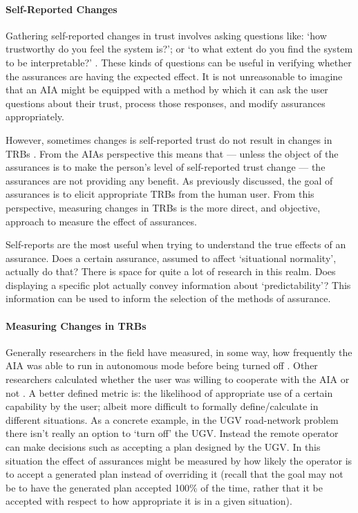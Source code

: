     \paragraph{Self-Reported Changes} Gathering self-reported changes in trust involves asking questions like: `how trustworthy do you feel the system is?'; or `to what extent do you find the system to be interpretable?' \cite{Mcknight2011-gv,Muir1996-gt,Wickens1999-la,Salem2015-md,Kaniarasu2013-ho}. These kinds of questions can be useful in verifying whether the assurances are having the expected effect. It is not unreasonable to imagine that an AIA might be equipped with a method by which it can ask the user questions about their trust, process those responses, and modify assurances appropriately.
    
    However, sometimes changes is self-reported trust do not result in changes in TRBs \cite{Dzindolet2003-ts}. From the AIAs perspective this means that --- unless the object of the assurances is to make the person's level of self-reported trust change --- the assurances are not providing any benefit. As previously discussed, the goal of assurances is to elicit appropriate TRBs from the human user. From this perspective, measuring changes in TRBs is the more direct, and objective, approach to measure the effect of assurances.

    Self-reports are the most useful when trying to understand the true effects of an assurance. Does a certain assurance, assumed to affect `situational normality', actually do that? There is space for quite a lot of research in this realm. Does displaying a specific plot actually convey information about `predictability'? This information can be used to inform the selection of the methods of assurance.

    \paragraph{Measuring Changes in TRBs} Generally researchers in the field have measured, in some way, how frequently the AIA was able to run in autonomous mode before being turned off \cite{Freedy2007-sg,Desai2012-rc}. Other researchers calculated whether the user was willing to cooperate with the AIA or not \cite{Salem2015-md,Wu2016-ei,Bainbridge2011-pl}. A better defined metric is: the likelihood of appropriate use of a certain capability by the user; albeit more difficult to formally define/calculate in different situations. As a concrete example, in the UGV road-network problem there isn't really an option to `turn off' the UGV. Instead the remote operator can make decisions such as accepting a plan designed by the UGV. In this situation the effect of assurances might be measured by how likely the operator is to accept a generated plan instead of overriding it (recall that the goal may not be to have the generated plan accepted 100\% of the time, rather that it be accepted with respect to how appropriate it is in a given situation).

